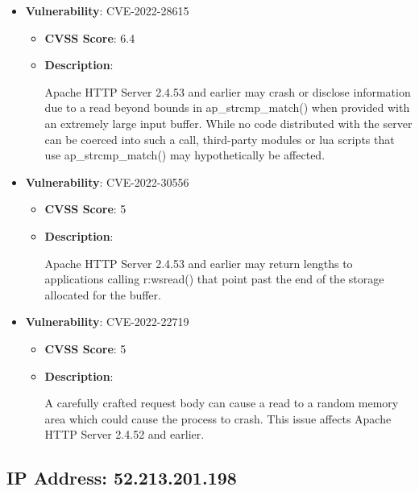 \documentclass{article}
\begin{document}
\begin{itemize}
        \item \textbf{Vulnerability}: CVE-2022-28615
        \begin{itemize}
            \item \textbf{CVSS Score}:  6.4 
            \item \textbf{Description}:
            \parbox[t]{0.9\linewidth}{
                \ttfamily Apache HTTP Server 2.4.53 and earlier may crash or disclose information due to a read beyond bounds in ap\_strcmp\_match() when provided with an extremely large input buffer. While no code distributed with the server can be coerced into such a call, third-party modules or lua scripts that use ap\_strcmp\_match() may hypothetically be affected.
            }
        \end{itemize}
    
        \item \textbf{Vulnerability}: CVE-2022-30556
        \begin{itemize}
            \item \textbf{CVSS Score}:  5 
            \item \textbf{Description}:
            \parbox[t]{0.9\linewidth}{
                \ttfamily Apache HTTP Server 2.4.53 and earlier may return lengths to applications calling r:wsread() that point past the end of the storage allocated for the buffer.
            }
        \end{itemize}
    
        \item \textbf{Vulnerability}: CVE-2022-22719
        \begin{itemize}
            \item \textbf{CVSS Score}:  5 
            \item \textbf{Description}:
            \parbox[t]{0.9\linewidth}{
                \ttfamily A carefully crafted request body can cause a read to a random memory area which could cause the process to crash. This issue affects Apache HTTP Server 2.4.52 and earlier.
            }
        \end{itemize}
    
\end{itemize}




\clearpage



\subsection{IP Address: 52.213.201.198}
\end{document}
